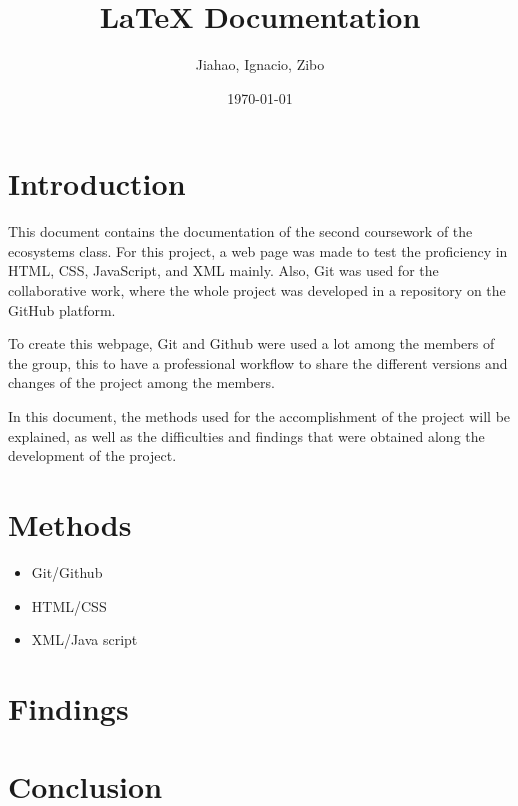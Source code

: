 \documentclass{article}
\title{LaTeX Documentation}
\author{Jiahao, Ignacio, Zibo}
\date{\today}
\begin{document}
\maketitle

\section{Introduction}

This document contains the documentation of the second coursework of the ecosystems class. For this project, a web page was made to test the proficiency in HTML, CSS, JavaScript, and XML mainly. Also, Git was used for the collaborative work, where the whole project was developed in a repository on the GitHub platform.

To create this webpage, Git and Github were used a lot among the members of the group, this to have a professional workflow to share the different versions and changes of the project among the members.

In this document, the methods used for the accomplishment of the project will be explained, as well as the difficulties and findings that were obtained along the development of the project.


\section{Methods}

\begin{itemize}
  \item Git/Github 
  \item HTML/CSS
  \item XML/Java script
\end{itemize}
\section{Findings}


    
\section{Conclusion}




\end{document}
